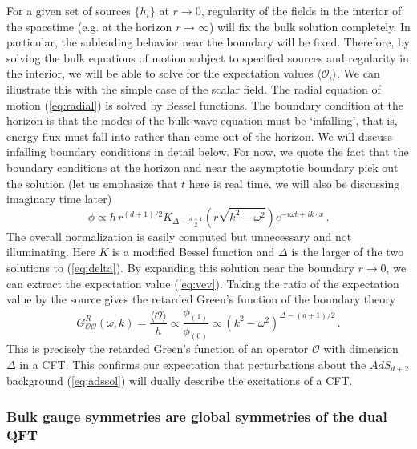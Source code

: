 \documentclass[10pt, oneside]{book}
\def\be{\begin{equation}}
\def\ee{\end{equation}}
\def\ocal{{\mathcal{O}}}
\begin{document}
\begin{doublespace}
For a given set of sources $\{h_i\}$ at $r \to 0$, regularity of the fields in the interior of the spacetime (e.g. at the horizon $r \to \infty$) will fix the bulk solution completely. In particular, the subleading behavior near the boundary will be fixed. Therefore, by solving the bulk equations of motion subject to specified sources and regularity in the interior, we will be able to solve for the expectation values $\langle \ocal_i \rangle$. We can illustrate this with the simple case of the scalar field. The radial equation of motion (\ref{eq:radial}) is solved by Bessel functions. The boundary condition at the horizon is that the modes of the bulk wave equation must be `infalling', that is, energy flux must fall into rather than come out of the horizon. We will discuss infalling boundary conditions in detail below. For now, we quote the fact that the boundary conditions at the horizon and near the asymptotic boundary pick out the solution (let us emphasize that $t$ here is real time, we will also be discussing imaginary time later)
\be
\phi \propto h \, r^{(d+1)/2} K_{\Delta-\frac{d+1}{2}}\left(r \sqrt{k^2 - \omega^2} \right) e^{- i \omega t + i k \cdot x} \,.
\ee
The overall normalization is easily computed but unnecessary and not illuminating.
Here $K$ is a modified Bessel function and $\Delta$ is the larger of the two solutions to (\ref{eq:delta}).
By expanding this solution near the boundary $r \to 0$, we can extract the expectation value (\ref{eq:vev}). Taking the ratio of the expectation value by the source gives the retarded Green's function of the boundary theory
\be\label{eq:easyG}
G^{R}_{\ocal\ocal}(\omega,k) = \frac{\langle \ocal \rangle}{h} \propto \frac{\phi_{(1)}}{\phi_{(0)}} \propto \left(k^2 - \omega^2 \right)^{\Delta - (d+1)/2} \,.
\ee
This is precisely the retarded Green's function of an operator $\ocal$ with dimension $\Delta$ in a CFT. This confirms our expectation that perturbations about the $AdS_{d+2}$ background (\ref{eq:adssol}) will dually describe the excitations of a CFT.

\subsubsection{Bulk gauge symmetries are global symmetries of the dual QFT}


\end{doublespace}
\end{document}
